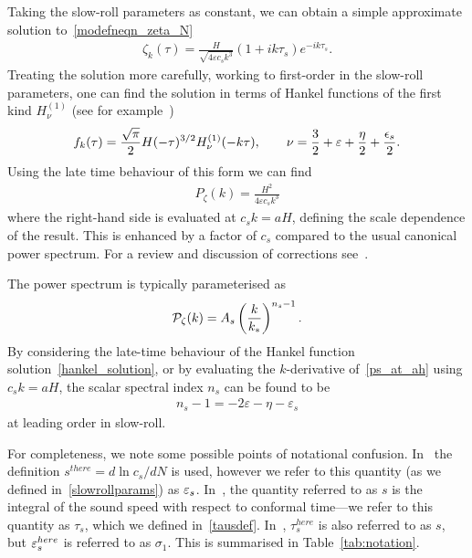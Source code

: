     Taking the slow-roll parameters as constant, we can obtain a simple approximate solution
    to~\eqref{modefneqn_zeta_N}
    \begin{align}\label{uk_solution}
        \zeta_k(\tau) = \frac{H}{\sqrt{4\varepsilon c_s k^3}}\left(1+ik\tau_s\right)e^{-i k\tau_s}.
    \end{align}
    Treating the solution more carefully, working to first-order in the slow-roll parameters, one can find
    the solution in terms of Hankel functions of the first kind $H_{\nu}^{(1)}$
    (see for example~\cite{px_burrage})
    \begin{align}\label{hankel_solution}
        f_k(\tau) = \frac{\sqrt{\pi}}{2}H(-\tau)^{3/2}H^{(1)}_{\nu}(-k\tau),\qquad
        \nu = \frac{3}{2}+\varepsilon+\frac{\eta}{2}+\frac{\epsilon_s}{2}.
    \end{align}
    Using the late time behaviour of this form we can find
    \begin{align}\label{ps_at_ah}
        P_\zeta(k) = \frac{H^2}{4\varepsilon c_s k^3}
    \end{align}
    where the right-hand side is evaluated at $c_sk=aH$,
    defining the scale dependence of the result.
    This is enhanced by a factor of $c_s$ compared to the
    usual canonical power spectrum.
    For a review and discussion of corrections see~\cite{px_burrage}.


The power spectrum is typically parameterised as
\begin{align}
    \mathcal{P}_{\mathcal{\zeta}}(k) = A_s \left(\frac{k}{k_*}\right)^{n_s-1}.
\end{align}
By considering the late-time behaviour of the Hankel function
solution~\eqref{hankel_solution},
or by evaluating the $k$-derivative of~\eqref{ps_at_ah}
using $c_sk=aH$,
the scalar spectral index $n_s$ can be found to be
\begin{align}
n_s-1 = -2\varepsilon-\eta-\varepsilon_s
\end{align}
at leading order in slow-roll.


    For completeness, we note some possible points of notational confusion.
    In~\cite{px_burrage} the definition $s^{there}=d\ln c_s/dN$ is used, however we refer to this
    quantity (as we defined in~\eqref{slowrollparams}) as $\varepsilon_{s}$.
    In~\cite{Hu_2011}, the quantity referred to as $s$ is the integral of the sound speed
    with respect to conformal time---we refer to this quantity as $\tau_s$,
    which we defined in~\eqref{tausdef}.
    In~\cite{warp_features_dbi}, $\tau_s^{here}$ is also referred to as $s$,
    but $\varepsilon_{s}^{here}$ is referred to as $\sigma_1$.
    This is summarised in Table~\ref{tab:notation}.


